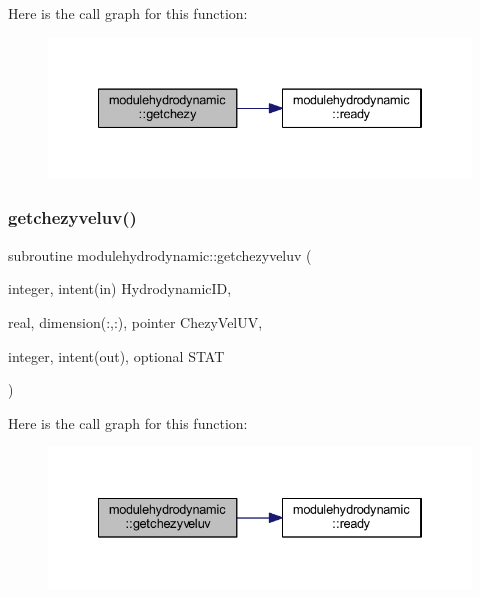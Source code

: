 Here is the call graph for this function\+:\nopagebreak
\begin{figure}[H]
\begin{center}
\leavevmode
\includegraphics[width=334pt]{namespacemodulehydrodynamic_a377c174d00228d8f36d2d1c5e10a7f32_cgraph}
\end{center}
\end{figure}
\mbox{\label{namespacemodulehydrodynamic_a95c4b43f87d68ca27ecae9520c33f91f}} 
\subsubsection{\texorpdfstring{getchezyveluv()}{getchezyveluv()}}
{\footnotesize\ttfamily subroutine modulehydrodynamic\+::getchezyveluv (\begin{DoxyParamCaption}\item[{integer, intent(in)}]{Hydrodynamic\+ID,  }\item[{real, dimension(\+:,\+:), pointer}]{Chezy\+Vel\+UV,  }\item[{integer, intent(out), optional}]{S\+T\+AT }\end{DoxyParamCaption})\hspace{0.3cm}{\ttfamily [private]}}

Here is the call graph for this function\+:\nopagebreak
\begin{figure}[H]
\begin{center}
\leavevmode
\includegraphics[width=334pt]{namespacemodulehydrodynamic_a95c4b43f87d68ca27ecae9520c33f91f_cgraph}
\end{center}
\end{figure}
\mbox{\label{namespacemodulehydrodynamic_a073f4ba07360a6b7522733db2651b41d}} 
